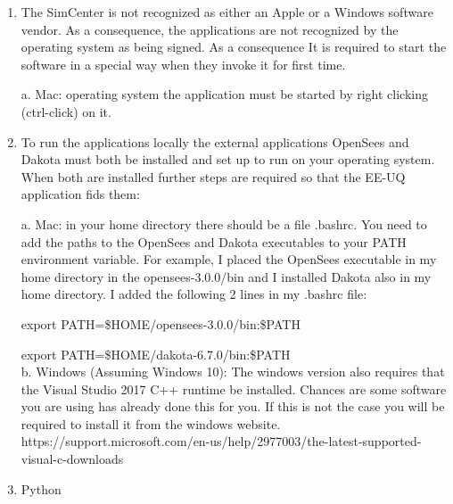 \begin{enumerate}
 \item The SimCenter is not recognized as either an Apple or a Windows software vendor. As a consequence, the applications are not recognized by the operating system as being signed. As a consequence It is required to start the software in a special way when they invoke it for first time. 
 
a.	Mac: operating system the application must be started by right clicking (ctrl-click) on it.

 \item To run the applications locally the external applications OpenSees and Dakota must both be installed and set up to run on your operating system. When both are installed further steps are required so that the EE-UQ application fids them:
  
a.	Mac: in your home directory there should be a file .bashrc. You need to add the paths to the OpenSees and Dakota executables to your PATH environment variable. For example, I placed the OpenSees executable in my home directory in the opensees-3.0.0/bin and I installed Dakota also in my home directory. I added the following 2 lines in my .bashrc file:

export PATH=\$HOME/opensees-3.0.0/bin:\$PATH

export PATH=\$HOME/dakota-6.7.0/bin:\$PATH \\

b.	Windows (Assuming Windows 10): The windows version also requires that the Visual Studio 2017 C++ runtime be installed. Chances are some software you are using has already done this for you. If this is not the case you will be required to install it from the windows website. \\
https://support.microsoft.com/en-us/help/2977003/the-latest-supported-visual-c-downloads

 \item Python
\end{enumerate}